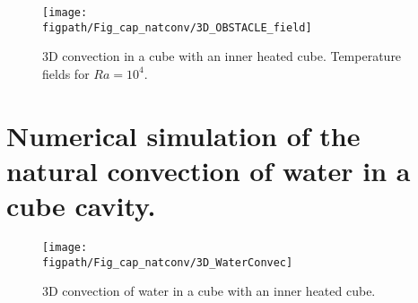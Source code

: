 \begin{figure} [!ht]
\begin{center}
\begin{minipage}{\linewidth}
 {\texttt{[image: \\figpath/Fig\_cap\_natconv/3D\_OBSTACLE\_field]}}
\end{minipage}
\end{center}
\caption{3D convection in a cube with an inner heated cube. Temperature fields for $Ra = 10^4$.}
\label{fig-obstacle-Ra1e4} 
\end{figure}

\clearpage
\newpage
\section{Numerical simulation of the natural convection of water in a cube cavity.} \label{sec-3D-water-convec}

\begin{figure} [!ht]
\begin{center}
\begin{minipage}{\linewidth}
 {\texttt{[image: \\figpath/Fig\_cap\_natconv/3D\_WaterConvec]}}
\end{minipage}
\end{center}
\caption{3D convection of water in a cube with an inner heated cube.}
\label{fig-3D_Water_convec} 
\end{figure}
